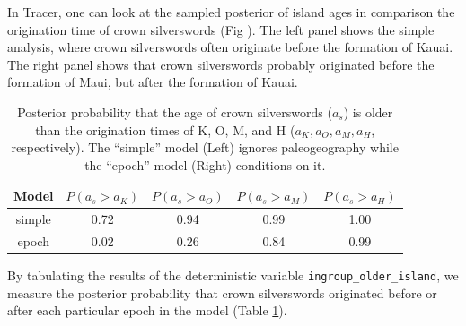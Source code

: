 In Tracer, one can look at the sampled posterior of island ages in comparison the origination time of crown silverswords (Fig \label{fig:epoch_ages}).
The left panel shows the simple analysis, where crown silverswords often originate before the formation of Kauai.
The right panel shows that crown silverswords probably originated before the formation of Maui, but after the formation of Kauai.

\begin{table}[!h]
\centering
\begin{tabular}{c|cccc}
Model       & $P(a_s>a_K)$ & $P(a_s>a_O)$ & $P(a_s>a_M)$ & $P(a_s>a_H)$ \\ \hline
simple & 0.72 & 0.94 & 0.99 & 1.00 \\
epoch & 0.02 & 0.26 & 0.84 & 0.99 \\
\end{tabular}
\caption{Posterior probability that the age of crown silverswords ($a_s$) is older than the origination times of K, O, M, and H ($a_K, a_O, a_M, a_H$, respectively). The ``simple'' model (Left) ignores paleogeography while the ``epoch'' model (Right) conditions on it.}
\label{tab:epoch_ages}
\end{table}

By tabulating the results of the deterministic variable {\tt ingroup\_older\_island}, we measure the posterior probability that crown silverswords originated before or after each particular epoch in the model (Table \ref{tab:epoch_ages}).


\newpage
